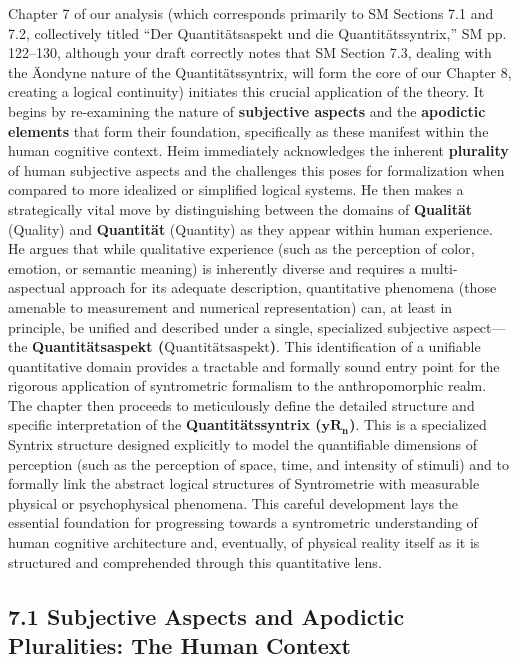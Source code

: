 \documentclass[12pt]{article}
\newcommand{\q}[1]{\enquote{#1}}
\newcommand{\quantitaetsaspekt}{\text{Quantitätsaspekt}}
\newcommand{\quantitaetssyntrix}{\bm{yR_n}}
\begin{document}
Chapter 7 of our analysis (which corresponds primarily to SM Sections 7.1 and 7.2, collectively titled \q{Der Quantitätsaspekt und die Quantitätssyntrix,} SM pp. 122–130, although your draft correctly notes that SM Section 7.3, dealing with the Äondyne nature of the Quantitätssyntrix, will form the core of our Chapter 8, creating a logical continuity) initiates this crucial application of the theory. It begins by re-examining the nature of \textbf{subjective aspects} and the \textbf{apodictic elements} that form their foundation, specifically as these manifest within the human cognitive context. Heim immediately acknowledges the inherent \textbf{plurality} of human subjective aspects and the challenges this poses for formalization when compared to more idealized or simplified logical systems. He then makes a strategically vital move by distinguishing between the domains of \textbf{Qualität} (Quality) and \textbf{Quantität} (Quantity) as they appear within human experience. He argues that while qualitative experience (such as the perception of color, emotion, or semantic meaning) is inherently diverse and requires a multi-aspectual approach for its adequate description, quantitative phenomena (those amenable to measurement and numerical representation) can, at least in principle, be unified and described under a single, specialized subjective aspect—the \textbf{Quantitätsaspekt (\(\quantitaetsaspekt\))}. This identification of a unifiable quantitative domain provides a tractable and formally sound entry point for the rigorous application of syntrometric formalism to the anthropomorphic realm. The chapter then proceeds to meticulously define the detailed structure and specific interpretation of the \textbf{Quantitätssyntrix (\(\quantitaetssyntrix\))}. This is a specialized Syntrix structure designed explicitly to model the quantifiable dimensions of perception (such as the perception of space, time, and intensity of stimuli) and to formally link the abstract logical structures of Syntrometrie with measurable physical or psychophysical phenomena. This careful development lays the essential foundation for progressing towards a syntrometric understanding of human cognitive architecture and, eventually, of physical reality itself as it is structured and comprehended through this quantitative lens.

\subsection{7.1 Subjective Aspects and Apodictic Pluralities: The Human Context}
\label{sec:subjective_aspects_pluralities}
\end{document}
